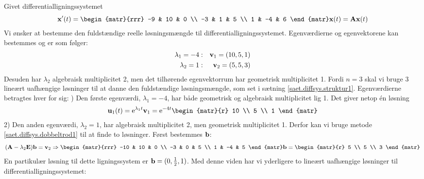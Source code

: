\begin{example}[Advanced] \label{eks.diffsys.dob.enk1}
Givet differentialligningssystemet
\begin{equation}
\mx'(t) = \begin{matr}{rrr} -9 & 10 & 0 \\ -3 & 1 & 5 \\ 1 & -4 & 6 \end{matr} \mx(t) = \mA \mx(t)
\end{equation}
Vi ønsker at bestemme den fuldstændige reelle løsningsmængde til differentialligningssystemet. Egenværdierne og egenvektorene kan bestemmes og er som følger:
\begin{eqnarray}
\lambda_1 = -4 &:& \mathbf{v}_1 = (10,5,1) \nonumber \\
\lambda_2 = 1 &:& \mathbf{v}_2 = (5,5,3)\nonumber
\end{eqnarray}
Desuden har $ \lambda_2 $ algebraisk multiplicitet 2, men det tilhørende egenvektorrum har geometrisk multiplicitet 1. Fordi $ n=3 $ skal vi bruge 3 lineært uafhængige løsninger til at danne den fuldstændige løsningsmængde, som set i sætning \ref{saet.diffsys.struktur1}. Egenværdierne betragtes hver for sig: ) Den første egenværdi, $ \lambda_1 = -4 $, har både geometrisk og algebraisk multiplicitet lig 1. Det giver netop én løsning
\begin{equation}
\mathbf u_1(t) = \e^{\lambda_1 t} \mv_1 = \e^{-4t} \begin{matr}{r} 10 \\ 5 \\ 1 \end{matr} 
\end{equation}
2) Den anden egenværdi, $ \lambda_2 = 1 $, har algebraisk multiplicitet 2, men geometrisk multiplicitet 1. Derfor kan vi bruge metode \ref{saet.diffsys.dobbeltrod1} til at finde to løsninger. Først bestemmes $ \mathbf{b} $:
\begin{equation}
(\mA - \lambda_2 \mE)\mb = \mv_2 \Rightarrow \begin{matr}{rrr} -10 & 10 & 0 \\ -3 & 0 & 5 \\ 1 & -4 & 5 \end{matr} \mb = \begin{matr}{r} 5 \\ 5 \\ 3 \end{matr}
\end{equation}
En partikulær løsning til dette ligningssystem er $ \mathbf{b} = (0,\frac{1}{2},1) $. Med denne viden har vi yderligere to lineært uafhængige løsninger til differentialligningssystemet:

\end{example}
